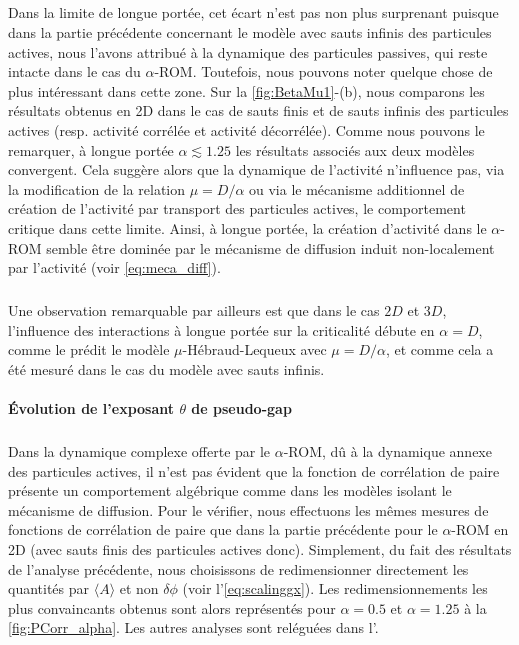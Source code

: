 \subparagraph{}Dans la limite de longue portée, cet écart n'est pas non plus surprenant puisque dans la partie précédente concernant le modèle avec sauts infinis des particules actives, nous l'avons attribué à la dynamique des particules passives, qui reste intacte dans le cas du $\alpha$-ROM. Toutefois, nous pouvons noter quelque chose de plus intéressant dans cette zone. Sur la \autoref{fig:BetaMu1}-(b), nous comparons les résultats obtenus en 2D dans le cas de sauts finis et de sauts infinis des particules actives (resp. activité corrélée et activité décorrélée). Comme nous pouvons le remarquer, à longue portée $\alpha \lesssim 1.25$ les résultats associés aux deux modèles convergent. Cela suggère alors que la dynamique de l'activité n'influence pas, via la modification de la relation $\mu=D/\alpha$ ou via le mécanisme additionnel de création de l'activité par transport des particules actives, le comportement critique dans cette limite. Ainsi, à longue portée, la création d'activité dans le $\alpha$-ROM semble être dominée par le mécanisme de diffusion induit non-localement par l'activité (voir \autoref{eq:meca_diff}).

\subparagraph{}Une observation remarquable par ailleurs est que dans le cas $2D$ et $3D$, l'influence des interactions à longue portée sur la criticalité débute en $\alpha = D$, comme le prédit le modèle $\mu$-Hébraud-Lequeux avec $\mu = D/\alpha$, et comme cela a été mesuré dans le cas du modèle avec sauts infinis. 

\paragraph{Évolution de l'exposant $\theta$ de pseudo-gap}

\subparagraph{}Dans la dynamique complexe offerte par le $\alpha$-ROM, dû à la dynamique annexe des particules actives, il n'est pas évident que la fonction de corrélation de paire présente un comportement algébrique comme dans les modèles isolant le mécanisme de diffusion. Pour le vérifier, nous effectuons les mêmes mesures de fonctions de corrélation de paire que dans la partie précédente pour le $\alpha$-ROM en 2D (avec sauts finis des particules actives donc). Simplement, du fait des résultats de l'analyse précédente, nous choisissons de redimensionner directement les quantités par $\langle A \rangle$ et non $\delta\phi$ (voir l'\autoref{eq:scalinggx}). Les redimensionnements les plus convaincants obtenus sont alors représentés pour $\alpha=0.5$ et $\alpha=1.25$ à la \autoref{fig:PCorr_alpha}. Les autres analyses sont reléguées dans l'. 

